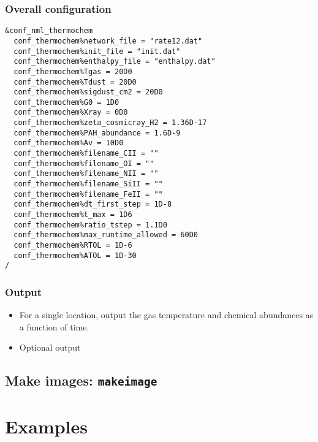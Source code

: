 \documentclass{article}
\newcommand{\makeimage}{\texttt{makeimage}}
\begin{document}
\subsubsection{Overall configuration}

\begin{lstlisting}
&conf_nml_thermochem
  conf_thermochem%network_file = "rate12.dat"
  conf_thermochem%init_file = "init.dat"
  conf_thermochem%enthalpy_file = "enthalpy.dat"
  conf_thermochem%Tgas = 20D0
  conf_thermochem%Tdust = 20D0
  conf_thermochem%sigdust_cm2 = 20D0
  conf_thermochem%G0 = 1D0
  conf_thermochem%Xray = 0D0
  conf_thermochem%zeta_cosmicray_H2 = 1.36D-17
  conf_thermochem%PAH_abundance = 1.6D-9
  conf_thermochem%Av = 10D0
  conf_thermochem%filename_CII = ""
  conf_thermochem%filename_OI = ""
  conf_thermochem%filename_NII = ""
  conf_thermochem%filename_SiII = ""
  conf_thermochem%filename_FeII = ""
  conf_thermochem%dt_first_step = 1D-8
  conf_thermochem%t_max = 1D6
  conf_thermochem%ratio_tstep = 1.1D0
  conf_thermochem%max_runtime_allowed = 60D0
  conf_thermochem%RTOL = 1D-6
  conf_thermochem%ATOL = 1D-30
/
\end{lstlisting}

\subsubsection{Output}

\begin{itemize}
  \item For a single location, output the gas temperature and chemical abundances as a function of time.
  \item Optional output
\end{itemize}  

\subsection{Make images: \makeimage}

\section{Examples}
\end{document}
